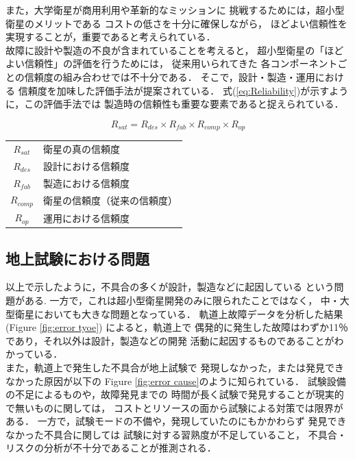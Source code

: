 \documentclass[11pt]{article}
\begin{document}
また，大学衛星が商用利用や革新的なミッションに
挑戦するためには，超小型衛星のメリットである
コストの低さを十分に確保しながら，
ほどよい信頼性を実現することが，重要であると考えられている\cite{SHIRASAKA2011}．\\
故障に設計や製造の不良が含まれていることを考えると，
超小型衛星の「ほどよい信頼性」の評価を行うためには，
従来用いられてきた
各コンポーネントごとの信頼度の組み合わせでは不十分である．
そこで，設計・製造・運用における
信頼度を加味した評価手法が提案されている\cite{SHIRASAKA2011}．
式(\ref{eq:Reliability})が示すように，この評価手法では
製造時の信頼性も重要な要素であると捉えられている．

\begin{equation}
   R_{sat} = R_{des} \times R_{fab} \times R_{comp} \times R_{op} \label{eq:Reliability}
\end{equation}
\begin{table}[H]
   \centering
      \begin{tabular}{cl} 
        $R_{sat}$ & 衛星の真の信頼度\\
        $R_{des}$ & 設計における信頼度\\
        $R_{fab}$ & 製造における信頼度\\
        $R_{comp}$ & 衛星の信頼度（従来の信頼度）\\
        $R_{op}$ & 運用における信頼度
      \end{tabular}
\end{table}

\subsection{地上試験における問題}
以上で示したように，不具合の多くが設計，製造などに起因している
という問題がある.
一方で，これは超小型衛星開発のみに限られたことではなく，
中・大型衛星においても大きな問題となっている．
軌道上故障データを分析した結果\cite{SAITO2011}(Figure \ref{fig:error tyoe})
によると，軌道上で
偶発的に発生した故障はわずか11％であり，それ以外は設計，製造などの開発
活動に起因するものであることがわかっている．\\
また，軌道上で発生した不具合が地上試験で
発現しなかった，または発見できなかった原因が以下の
Figure \ref{fig:error cause}のように知られている．
試験設備の不足によるものや，故障発見までの
時間が長く試験で発見することが現実的で無いものに関しては，
コストとリソースの面から試験による対策では限界がある．
一方で，試験モードの不備や，発現していたのにもかかわらず
発見できなかった不具合に関しては
試験に対する習熟度が不足していること，
不具合・リスクの分析が不十分であることが推測される\cite{SAITO2011}．
\end{document}
